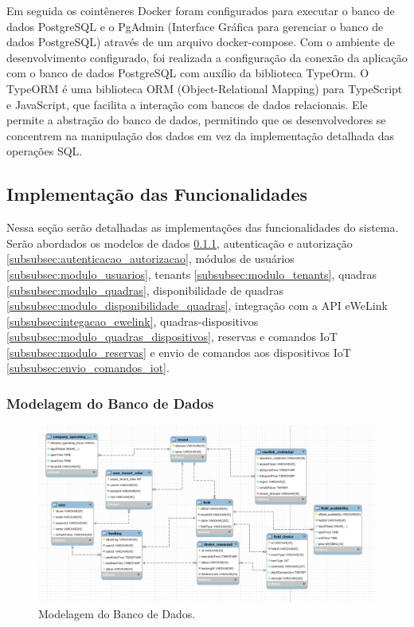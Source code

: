 Em seguida os cointêneres Docker foram configurados para executar o banco de dados PostgreSQL e o PgAdmin (Interface Gráfica para gerenciar o banco de dados PostgreSQL) através de um arquivo docker-compose. Com o ambiente de desenvolvimento configurado, foi realizada a configuração da conexão da aplicação com o banco de dados PostgreSQL com auxílio da biblioteca TypeOrm. O TypeORM é uma biblioteca ORM (Object-Relational Mapping) para TypeScript e JavaScript, que facilita a interação com bancos de dados relacionais. Ele permite a abstração do banco de dados, permitindo que os desenvolvedores se concentrem na manipulação dos dados em vez da implementação detalhada das operações SQL.

\subsection{Implementação das Funcionalidades}\label{subsec:implementacao_funcionalidades}

Nessa seção serão detalhadas as implementações das funcionalidades do sistema. Serão abordados os modelos de dados \ref{subsubsec:modelagem_banco_dados}, autenticação e autorização \ref{subsubsec:autenticacao_autorizacao}, módulos de usuários \ref{subsubsec:modulo_usuarios}, tenants \ref{subsubsec:modulo_tenants}, quadras \ref{subsubsec:modulo_quadras}, disponibilidade de quadras \ref{subsubsec:modulo_disponibilidade_quadras}, integração com a API eWeLink \ref{subsubsec:integacao_ewelink}, quadras-dispositivos \ref{subsubsec:modulo_quadras_dispositivos}, reservas e comandos IoT \ref{subsubsec:modulo_reservas} e envio de comandos aos dispositivos IoT \ref{subsubsec:envio_comandos_iot}.
\subsubsection{Modelagem do Banco de Dados}\label{subsubsec:modelagem_banco_dados}

\begin{figure}[htp]
	\caption{\label{fig:modelagem_banco_dados}Modelagem do Banco de Dados.}
	\begin{center}
	  \includegraphics[scale=0.38]{images/cap5/modelage_banco_dados.png}
	\end{center}
\end{figure}

